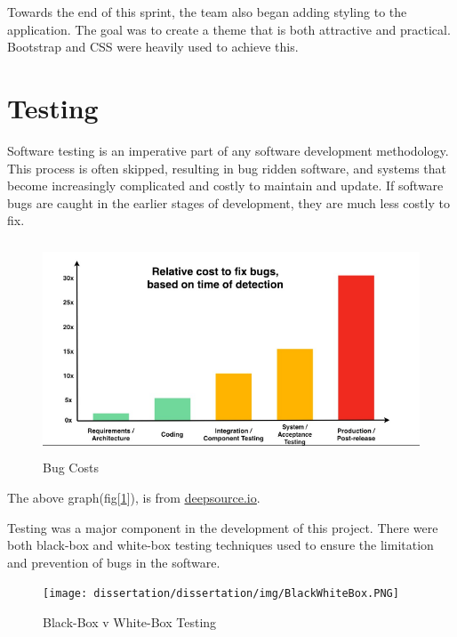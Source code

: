Towards the end of this sprint, the team also began adding styling to the application. The goal was to create a theme that is both attractive and practical. Bootstrap and CSS were heavily used to achieve this.
\section{Testing}
\label{sec:MethodologyTesting}
Software testing is an imperative part of any software development methodology\cite{ammann2016introduction}. This process is often skipped, resulting in bug ridden software, and systems that become increasingly complicated and costly to maintain and update. If software bugs are caught in the earlier stages of development, they are much less costly to fix. 

\bigskip

\begin{figure}[h]
    \centering
    \includegraphics[width=\textwidth, height=180pt]{BugCosts.PNG}
    \caption{Bug Costs}
    \label{fig:bugCosts}
\end{figure}


\bigskip

The above graph(fig[\ref{fig:bugCosts}]), is from \href{https://deepsource.io/blog/exponential-cost-of-fixing-bugs/}{\underline{deepsource.io}}.

\bigskip

Testing was a major component in the development of this project. There were both black-box and white-box testing techniques used to ensure the limitation and prevention of bugs in the software. 

\bigskip

\begin{figure}[H]
    \centering
    \texttt{[image: dissertation/dissertation/img/BlackWhiteBox.PNG]}
    \caption{Black-Box v White-Box Testing}
    \label{fig:whiteBox}
\end{figure}

